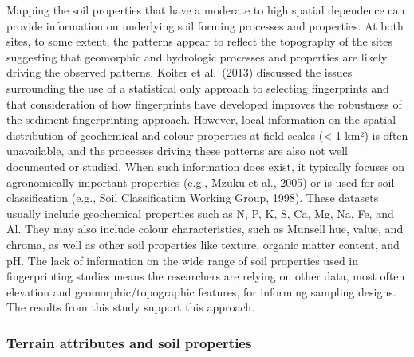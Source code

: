 \documentclass[
  number]{elsarticle}
\begin{document}
Mapping the soil properties that have a moderate to high spatial
dependence can provide information on underlying soil forming processes
and properties. At both sites, to some extent, the patterns appear to
reflect the topography of the sites suggesting that geomorphic and
hydrologic processes and properties are likely driving the observed
patterns. Koiter et al.~(2013) discussed the issues surrounding the use
of a statistical only approach to selecting fingerprints and that
consideration of how fingerprints have developed improves the robustness
of the sediment fingerprinting approach. However, local information on
the spatial distribution of geochemical and colour properties at field
scales (\textless{} 1 km²) is often unavailable, and the processes
driving these patterns are also not well documented or studied. When
such information does exist, it typically focuses on agronomically
important properties (e.g., Mzuku et al., 2005) or is used for soil
classification (e.g., Soil Classification Working Group, 1998). These
datasets usually include geochemical properties such as N, P, K, S, Ca,
Mg, Na, Fe, and Al. They may also include colour characteristics, such
as Munsell hue, value, and chroma, as well as other soil properties like
texture, organic matter content, and pH. The lack of information on the
wide range of soil properties used in fingerprinting studies means the
researchers are relying on other data, most often elevation and
geomorphic/topographic features, for informing sampling designs. The
results from this study support this approach.

\subsubsection{Terrain attributes and soil
properties}\label{terrain-attributes-and-soil-properties}
\end{document}
